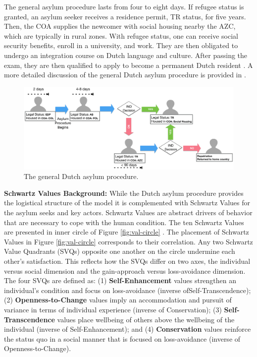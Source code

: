 \documentclass{scspaperproc}
\theoremstyle{scsthe}
\begin{document}
The general asylum procedure lasts from four to eight days. If refugee status is granted, an asylum seeker receives a residence permit, TR status, for five years. Then, the COA supplies the newcomer with social housing nearby the AZC, which are typically in rural zones. With refugee status, one can receive social security benefits, enroll in a university, and work. They are then obligated to undergo an integration course on Dutch language and culture. After passing the exam, they are then qualified to apply to become a permanent Dutch resident \cite{9}. A more detailed discussion of the general Dutch asylum procedure is provided in \cite{phil.masters.thesis}.

\begin{figure}[htb]
{
\centering
\includegraphics[width=0.65\columnwidth]{Asylum-Procedure.png}
\caption{The general Dutch asylum procedure.}
\label{fig:asy-proc}
}
\end{figure}

{\bf Schwartz Values Background:} While the Dutch asylum procedure provides the logistical structure of the model it is complemented with Schwartz Values for the asylum seeks and key actors. Schwartz Values are abstract drivers of behavior that are necessary to cope with the human condition. The ten Schwartz Values are presented in inner circle of Figure \ref{fig:val-circle} \cite{76}. The placement of Schwartz Values in Figure \ref{fig:val-circle} corresponds to their correlation. Any two Schwartz Value Quadrants (SVQs) opposite one another on the circle undermine each other's satisfaction. This reflects how the SVQs differ on two axes, the individual versus social dimension and the gain-approach versus loss-avoidance dimension. The four SVQs are defined as: (1) {\bf Self-Enhancement} values strengthen an individual's condition and focus on loss-avoidance (inverse ofSelf-Transcendence); (2)  {\bf Openness-to-Change} values imply an accommodation and pursuit of variance in terms of individual experience (inverse of Conservation); (3) {\bf Self-Transcendence} values place wellbeing of others above the wellbeing of the individual (inverse of Self-Enhancement); and (4) {\bf Conservation} values reinforce the status quo in a social manner that is focused on loss-avoidance (inverse of Openness-to-Change).
\end{document}

